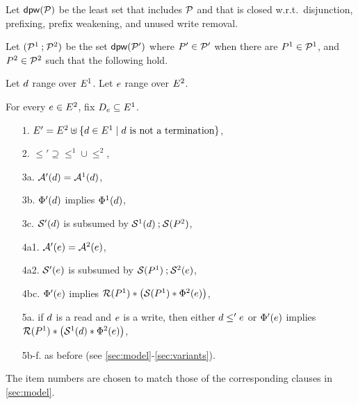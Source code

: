 \begin{definition}
  \label{def:semi:seq}
  Let $\mathsf{dpw}(\mathcal{P})$ be the least set that
  includes $\mathcal{P}$ and that is closed w.r.t.~disjunction, prefixing, prefix weakening, and
  unused write removal.                  

  Let $(\mathcal{P}^1 \mathbin; \mathcal{P}^2)$ be the set
  \begin{math}
    \mathsf{dpw}(\mathcal{P}')
  \end{math}
  where $P'\in\mathcal{P}'$ when there are $P^1 \in \mathcal{P}^1$,
  and $P^2\in\mathcal{P}^2$
  such that the following hold.

  Let $d$ range over $E^1$.  Let $e$ range over $E^2$.

  For every $e\in E^2$, fix $D_e\subseteq E^1$.
      
\begin{enumerate}
\item[1.] $E' = E^2 \uplus \{d\in E^1\mid d\text{ is not a termination}\}$,
\item[2.] ${\le'}\supseteq{\le^1}\cup{\le^2}$, 
\item[3a.] $\mathcal{A}'(d) = \mathcal{A}^1(d)$,
\item[3b.] $\Phi'(d)$ implies $\Phi^1(d)$,
\item[3c.] $\mathcal{S}'(d)$ is subsumed by $\mathcal{S}^1(d)\mathbin{;} \mathcal{S}(P^2)$,
\item[4a1.] $\mathcal{A}'(e) = \mathcal{A}^2(e)$,
\item[4a2.] $\mathcal{S}'(e)$ is subsumed by $\mathcal{S}(P^1)\mathbin{;}\mathcal{S}^2(e)$,
\item[4bc.] $\Phi'(e)$ implies
  $\mathcal{R}({P^1}) \mathbin{\ast} \bigl(\mathcal{S}(P^1)\mathbin{\ast}\Phi^2(e)\bigr)$, 
\item[5a.] if $d$ is a read and $e$ is a write,
  then either $d\le'e$ or $\Phi'(e)$ implies $\mathcal{R}({P^1})\mathbin{\ast} \bigl(\mathcal{S}^1(d)\mathbin{\ast}\Phi^2(e)\bigr)$,
\item[5b-f.] as before (see \textsection\ref{sec:model}-\ref{sec:variants}). %
\end{enumerate}
\end{definition}

The item numbers are chosen to match those of the corresponding clauses in
\textsection\ref{sec:model}.  

